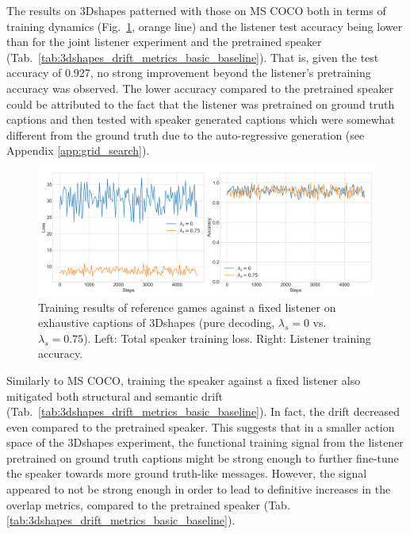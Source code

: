 The results on 3Dshapes patterned with those on MS COCO both in terms of training dynamics (Fig.~\ref{fig:3dshapes_fixed_listener_0_075_speaker_losses_listener_acc}, orange line) and the listener test accuracy being lower than for the joint listener experiment and the pretrained speaker (Tab.~\ref{tab:3dshapes_drift_metrics_basic_baseline}). That is, given the test accuracy of 0.927, no strong improvement beyond the listener's pretraining accuracy was observed. 
The lower accuracy compared to the pretrained speaker could be attributed to the fact that the listener was pretrained on ground truth captions and then tested with speaker generated captions which were somewhat different from the ground truth due to the auto-regressive generation (see Appendix \ref{app:grid_search}). 
\begin{figure}[h]
	\centering
	\includegraphics[width=\linewidth]{images/3dshapes_fixedListener_baseline_random_0_075_losses.png}
	\caption{Training results of reference games against a fixed listener on exhaustive captions of 3Dshapes (pure decoding, $\lambda_s=0$ vs. $\lambda_s=0.75$). Left: Total speaker training loss. Right: Listener training accuracy.}
	\label{fig:3dshapes_fixed_listener_0_075_speaker_losses_listener_acc}
\end{figure}

Similarly to MS COCO, training the speaker against a fixed listener also mitigated both structural and semantic drift (Tab.~\ref{tab:3dshapes_drift_metrics_basic_baseline}). In fact, the drift decreased even compared to the pretrained speaker. This suggests that in a smaller action space of the 3Dshapes experiment, the functional training signal from the listener pretrained on ground truth captions might be strong enough to further fine-tune the speaker towards more ground truth-like messages. However, the signal appeared to not be strong enough in order to lead to definitive increases in the overlap metrics, compared to the pretrained speaker (Tab. \ref{tab:3dshapes_drift_metrics_basic_baseline}). 


